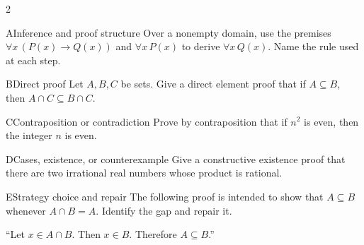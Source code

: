 \documentclass[9pt]{extarticle}
\begin{document}
\begin{multicols}{2}
\begin{CoreProblem}{A}{Inference and proof structure}
Over a nonempty domain, use the premises
$\forall x\,(P(x)\to Q(x))$ and $\forall x\,P(x)$ to derive
$\forall x\,Q(x)$. Name the rule used at each step.
\end{CoreProblem}
\begin{CoreProblem}{B}{Direct proof}
Let $A,B,C$ be sets. Give a direct element proof that if $A\subseteq B$, then
$A\cap C\subseteq B\cap C$.
\end{CoreProblem}
\begin{CoreProblem}{C}{Contraposition or contradiction}
Prove by contraposition that if $n^2$ is even, then the integer $n$ is even.
\end{CoreProblem}
\columnbreak
\begin{CoreProblem}{D}{Cases, existence, or counterexample}
Give a constructive existence proof that there are two irrational real numbers
whose product is rational.
\end{CoreProblem}
\begin{CoreProblem}{E}{Strategy choice and repair}
The following proof is intended to show that $A\subseteq B$ whenever
$A\cap B=A$. Identify the gap and repair it.

``Let $x\in A\cap B$. Then $x\in B$. Therefore $A\subseteq B$.''
\end{CoreProblem}
\end{multicols}
\CoreWorkArea
\FormBreak
{}
\end{document}
